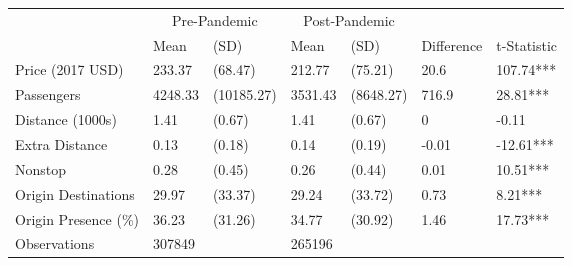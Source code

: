 
\begin{tabular}[t]{lllllll}
\toprule
\multicolumn{1}{c}{ } & \multicolumn{2}{c}{Pre-Pandemic} & \multicolumn{2}{c}{Post-Pandemic} & \multicolumn{2}{c}{ } \\
\cmidrule(l{3pt}r{3pt}){2-3} \cmidrule(l{3pt}r{3pt}){4-5}
 & Mean & (SD) & Mean & (SD) & Difference & t-Statistic\\
\midrule
Price (2017 USD) & 233.37 & (68.47) & 212.77 & (75.21) & 20.6 & 107.74***\\
Passengers & 4248.33 & (10185.27) & 3531.43 & (8648.27) & 716.9 & 28.81***\\
Distance (1000s) & 1.41 & (0.67) & 1.41 & (0.67) & 0 & -0.11\\
Extra Distance & 0.13 & (0.18) & 0.14 & (0.19) & -0.01 & -12.61***\\
Nonstop & 0.28 & (0.45) & 0.26 & (0.44) & 0.01 & 10.51***\\
Origin Destinations & 29.97 & (33.37) & 29.24 & (33.72) & 0.73 & 8.21***\\
Origin Presence (\%) & 36.23 & (31.26) & 34.77 & (30.92) & 1.46 & 17.73***\\
Observations & 307849 &  & 265196 &  &  & \\
\bottomrule
\end{tabular}
